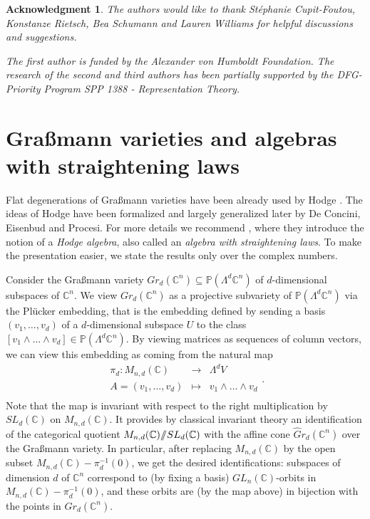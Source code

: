 \documentclass{emsprocart}
\newtheorem*{ack}{Acknowledgment}
\theoremstyle{definition}
\begin{document}
\begin{ack}\rm The authors would like to thank St\'ephanie Cupit-Foutou, Konstanze Rietsch, 
Bea Schumann and Lauren Williams for helpful discussions and suggestions.

The first author is funded by the Alexander von Humboldt
Foundation. The research of the second and third authors has been partially supported
by the DFG-Priority Program SPP 1388 - Representation Theory.
\end{ack}
\section{Gra\ss mann varieties and algebras with straightening laws}\label{Sec:Grassmannian}
Flat degenerations of Gra\ss mann varieties have been already used by
Hodge \cite{Hodge}. The ideas of Hodge have been formalized and largely generalized later by
De Concini, Eisenbud and Procesi. For more details we recommend \cite{DEP}, where they introduce
the notion of a \textit{Hodge algebra}, also called an \textit{algebra with straightening laws}.
To make the presentation easier, we state the results only over the complex numbers.

Consider the Gra\ss mann variety $Gr_{d}(\mathbb C^n)\subseteq \mathbb P(\Lambda^d\mathbb C^n)$ of
$d$-dimensional subspaces of $\mathbb C^n$. We view $Gr_{d}(\mathbb C^n)$ as a projective
subvariety of $\mathbb P(\Lambda^d\mathbb C^n)$ via the Pl\"ucker embedding, that is the embedding defined by sending a basis $(v_1,\ldots,v_d)$ of a $d$-dimensional
subspace $U$ to the class $[v_1\wedge\ldots\wedge v_d]\in \mathbb P(\Lambda^d\mathbb C^n)$.
By viewing matrices as sequences of column vectors, we can view this embedding as coming from the natural map
\begin{equation}\label{exteriorproduct}
\begin{matrix}
\pi_{d}:M_{n,d}(\mathbb C)&\to &\Lambda^{d}V\\
A=(v_1,\dots,v_d)&\mapsto&v_1\wedge \dots \wedge v_d\\
\end{matrix}.
\end{equation}
Note that the map is invariant with respect to the right multiplication by $SL_d(\mathbb C)$ on $M_{n,d}(\mathbb C)$.
It provides by classical invariant theory an identification of the categorical
quotient $M_{n,d}(\mathbb C)/\hskip-3.5pt/ SL_d(\mathbb C)$ with the affine cone $\widehat Gr_{d}(\mathbb C^n)$
over the Gra\ss mann variety. In particular, after replacing $M_{n,d}(\mathbb C)$ by the open subset
${M}_{n,d}(\mathbb C)-\pi_d^{-1}(0)$, we get the desired identifications: subspaces of dimension $d$ of $\mathbb C^n$
correspond to (by fixing a basis) $GL_n(\mathbb C)$-orbits in $M_{n,d}(\mathbb C)-\pi_d^{-1}(0)$, and these orbits
are (by the map above) in bijection with the points in $Gr_{d}(\mathbb C^n)$.
\end{document}
